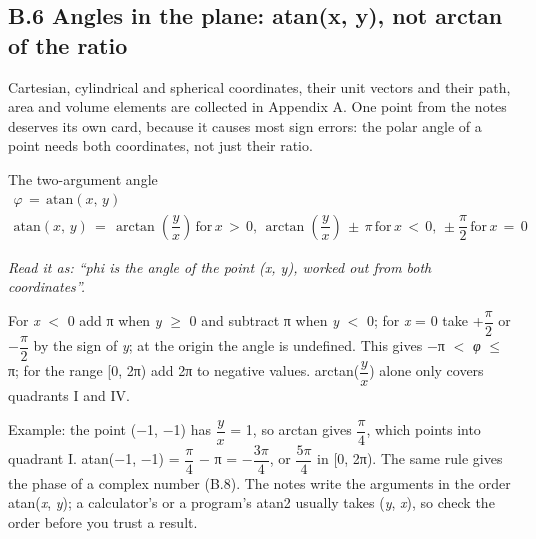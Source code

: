 \documentclass[11pt]{article}
\begin{document}
\begin{keepsection}
\section{B.6 Angles in the plane: atan(x, y), not arctan of the ratio}

Cartesian, cylindrical and spherical coordinates, their unit vectors and their path, area and volume elements are collected in Appendix A. One point from the notes deserves its own card, because it causes most sign errors: the polar angle of a point needs both coordinates, not just their ratio.

\begin{equationcard}{The two-argument angle}
\[ \begin{gathered} {φ}\, =\, \text{atan}({x},\, {y}) \\ \text{atan}({x},\, {y})\, =\, \arctan \left(\dfrac{{y}}{{x}}\right)\, \text{for}\, {x}\, >\, 0,\, \arctan \left(\dfrac{{y}}{{x}}\right)\, \pm \, π\, \text{for}\, {x}\, <\, 0,\, \pm \dfrac{π}{2}\, \text{for}\, {x}\, =\, 0 \end{gathered} \]
{\small \emph{Read it as: “phi is the angle of the point (x, y), worked out from both coordinates”.}\par For \textit{x} \ensuremath{<} 0 add π when \textit{y} \ensuremath{\geq} 0 and subtract π when \textit{y} \ensuremath{<} 0; for \textit{x} = 0 take +{\small\ensuremath{\dfrac{π}{2}}} or \ensuremath{-}{\small\ensuremath{\dfrac{π}{2}}} by the sign of \textit{y}; at the origin the angle is undefined. This gives \ensuremath{-}π \ensuremath{<} \textit{φ} \ensuremath{\leq} π; for the range [0, 2π) add 2π to negative values. arctan({\small\ensuremath{\dfrac{{y}}{{x}}}}) alone only covers quadrants I and IV.}
\end{equationcard}

Example: the point (\ensuremath{-}1, \ensuremath{-}1) has {\small\ensuremath{\dfrac{{y}}{{x}}}} = 1, so arctan gives {\small\ensuremath{\dfrac{π}{4}}}, which points into quadrant I. atan(\ensuremath{-}1, \ensuremath{-}1) = {\small\ensuremath{\dfrac{π}{4}}} \ensuremath{-} π = \ensuremath{-}{\small\ensuremath{\dfrac{3π}{4}}}, or {\small\ensuremath{\dfrac{5π}{4}}} in [0, 2π). The same rule gives the phase of a complex number (B.8). The notes write the arguments in the order atan(\textit{x}, \textit{y}); a calculator's or a program's atan2 usually takes (\textit{y}, \textit{x}), so check the order before you trust a result.
\end{keepsection}
\end{document}
